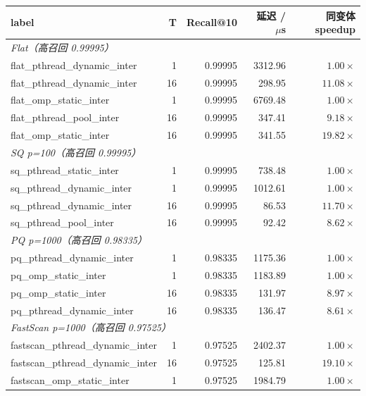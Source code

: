 \documentclass[a4paper,11pt,UTF8]{ctexart}
\begin{document}
\begin{table}[H]
  \centering\scriptsize
  \begin{tabular}{lrrrr}
    \toprule
    label & T & Recall@10 & 延迟 / $\mu$s & 同变体 speedup \\
    \midrule
    \multicolumn{5}{l}{\textit{Flat（高召回 0.99995）}} \\
    flat\_pthread\_dynamic\_inter & 1  & 0.99995 & 3312.96 & $1.00\times$ \\
    flat\_pthread\_dynamic\_inter & 16 & 0.99995 &  298.95 & $11.08\times$ \\
    flat\_omp\_static\_inter      & 1  & 0.99995 & 6769.48 & $1.00\times$ \\
    flat\_pthread\_pool\_inter    & 16 & 0.99995 &  347.41 & $9.18\times$ \\
    flat\_omp\_static\_inter      & 16 & 0.99995 &  341.55 & $19.82\times$ \\
    \midrule
    \multicolumn{5}{l}{\textit{SQ p=100（高召回 0.99995）}} \\
    sq\_pthread\_static\_inter    & 1  & 0.99995 &  738.48 & $1.00\times$ \\
    sq\_pthread\_dynamic\_inter   & 1  & 0.99995 & 1012.61 & $1.00\times$ \\
    sq\_pthread\_dynamic\_inter   & 16 & 0.99995 &   86.53 & $11.70\times$ \\
    sq\_pthread\_pool\_inter      & 16 & 0.99995 &   92.42 & $8.62\times$ \\
    \midrule
    \multicolumn{5}{l}{\textit{PQ p=1000（高召回 0.98335）}} \\
    pq\_pthread\_dynamic\_inter   & 1  & 0.98335 & 1175.36 & $1.00\times$ \\
    pq\_omp\_static\_inter        & 1  & 0.98335 & 1183.89 & $1.00\times$ \\
    pq\_omp\_static\_inter        & 16 & 0.98335 &  131.97 & $8.97\times$ \\
    pq\_pthread\_dynamic\_inter   & 16 & 0.98335 &  136.47 & $8.61\times$ \\
    \midrule
    \multicolumn{5}{l}{\textit{FastScan p=1000（高召回 0.97525）}} \\
    fastscan\_pthread\_dynamic\_inter & 1  & 0.97525 & 2402.37 & $1.00\times$ \\
    fastscan\_pthread\_dynamic\_inter & 16 & 0.97525 &  125.81 & $19.10\times$ \\
    fastscan\_omp\_static\_inter      & 1  & 0.97525 & 1984.79 & $1.00\times$ \\

\end{tabular}
\end{table}
\end{document}
